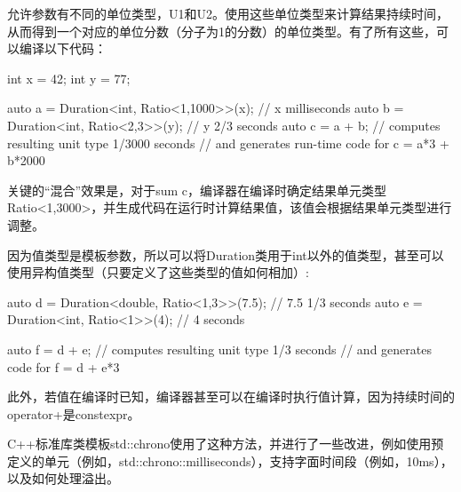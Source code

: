 允许参数有不同的单位类型，U1和U2。使用这些单位类型来计算结果持续时间，从而得到一个对应的单位分数（分子为1的分数）的单位类型。有了所有这些，可以编译以下代码：

\begin{cpp}
int x = 42;
int y = 77;

auto a = Duration<int, Ratio<1,1000>>(x); // x milliseconds
auto b = Duration<int, Ratio<2,3>>(y); // y 2/3 seconds
auto c = a + b; // computes resulting unit type 1/3000 seconds
				// and generates run-time code for c = a*3 + b*2000
\end{cpp}

关键的“混合”效果是，对于sum c，编译器在编译时确定结果单元类型Ratio<1,3000>，并生成代码在运行时计算结果值，该值会根据结果单元类型进行调整。

因为值类型是模板参数，所以可以将Duration类用于int以外的值类型，甚至可以使用异构值类型（只要定义了这些类型的值如何相加）:

\begin{cpp}
auto d = Duration<double, Ratio<1,3>>(7.5); // 7.5 1/3 seconds
auto e = Duration<int, Ratio<1>>(4); // 4 seconds

auto f = d + e; // computes resulting unit type 1/3 seconds
				// and generates code for f = d + e*3
\end{cpp}

此外，若值在编译时已知，编译器甚至可以在编译时执行值计算，因为持续时间的operator+是constexpr。

C++标准库类模板std::chrono使用了这种方法，并进行了一些改进，例如使用预定义的单元（例如，std::chrono::milliseconds），支持字面时间段（例如，10ms），以及如何处理溢出。































